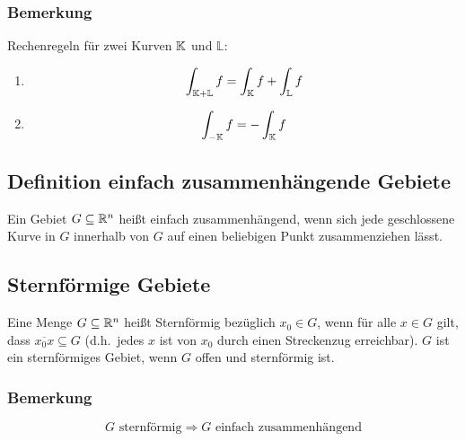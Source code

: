 \subsubsection{Bemerkung}
Rechenregeln für zwei Kurven $\mathbb{K}$ und $\mathbb{L}$:
\begin{enumerate}[label= (\alph*)]
    \item
        \begin{equation*}
            \int_{\mathbb{K} + \mathbb{L}} f = \int_{\mathbb{K}} f + \int_\mathbb{L} f
        \end{equation*}
    \item
        \begin{equation*}
            \int_{-\mathbb{K}} f = - \int_{\mathbb{K}} f
        \end{equation*}
\end{enumerate}

\subsection{Definition einfach zusammenhängende Gebiete}
Ein Gebiet $G \subseteq \mathbb{R}^n$ heißt einfach zusammenhängend, wenn sich jede
geschlossene Kurve in $G$ innerhalb von $G$ \glqq{}auf einen beliebigen
Punkt zusammenziehen lässt\grqq{}.

\subsection{Sternförmige Gebiete}
Eine Menge $G \subseteq \mathbb{R}^n$ heißt Sternförmig bezüglich $x_0 \in G$, wenn für
alle $x \in G$ gilt, dass $\overline{x_0x} \subseteq G$ (d.h.\ jedes $x$ ist von
$x_0$ durch einen Streckenzug erreichbar). $G$ ist ein sternförmiges Gebiet,
wenn $G$ offen und sternförmig ist.

\subsubsection{Bemerkung}
\begin{equation*}
    G \text{ sternförmig} \Rightarrow G \text{ einfach zusammenhängend}
\end{equation*}

